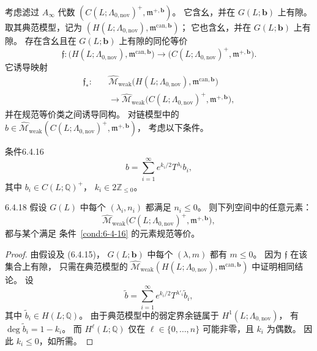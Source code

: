 考虑滤过 $A_\infty$ 代数
$(C(L;\Lambda_{0,\mathrm{nov}})^+,
\mathfrak m^{+,\boldsymbol b})$。
它含幺，并在 $G(L;\boldsymbol b)$ 上有隙。
取其典范模型，记为
$(H(L;\Lambda_{0,\mathrm{nov}}),
\mathfrak m^{\mathrm{can},\boldsymbol b})$；
它也含幺，并在 $G(L;\boldsymbol b)$ 上有隙。
存在含幺且在 $G(L;\boldsymbol b)$ 上有隙的同伦等价
\[
\mathfrak f:
\bigl(H(L;\Lambda_{0,\mathrm{nov}}),
\mathfrak m^{\mathrm{can},\boldsymbol b}\bigr)
\longrightarrow
\bigl(C(L;\Lambda_{0,\mathrm{nov}})^+,
\mathfrak m^{+,\boldsymbol b}\bigr).
\]
它诱导映射
\[
\begin{aligned}
\mathfrak f_*:\quad
&\widehat{\mathcal M}_{\mathrm{weak}}
\bigl(H(L;\Lambda_{0,\mathrm{nov}}),
\mathfrak m^{\mathrm{can},\boldsymbol b}\bigr)\\
&\longrightarrow
\widehat{\mathcal M}_{\mathrm{weak}}
\bigl(C(L;\Lambda_{0,\mathrm{nov}})^+,
\mathfrak m^{+,\boldsymbol b}\bigr),
\end{aligned}
\]
并在规范等价类之间诱导同构。
对链模型中的
$b\in\widehat{\mathcal M}_{\mathrm{weak}}
(C(L;\Lambda_{0,\mathrm{nov}})^+,
\mathfrak m^{+,\boldsymbol b})$，
考虑以下条件。

\begin{statement}{条件}{6.4.16}\label{cond:6-4-16}
\begin{equation}
b=\sum_{i=1}^{\infty}
e^{k_i/2}T^{\lambda_i}b_i,
\tag{6.4.17}\label{eq:6-4-17}
\end{equation}
其中 $b_i\in C(L;\mathbb Q)^+$，
$k_i\in2\mathbb Z_{\le0}$。
\end{statement}

\begin{lemma}{6.4.18}\label{lem:6-4-18}
假设 $G(L)$ 中每个
$(\lambda_i,n_i)$ 都满足 $n_i\le0$。
则下列空间中的任意元素：
\[
\widehat{\mathcal M}_{\mathrm{weak}}
\bigl(C(L;\Lambda_{0,\mathrm{nov}})^+,
\mathfrak m^{+,\boldsymbol b}\bigr),
\]
都与某个满足
条件~\ref{cond:6-4-16} 的元素规范等价。
\end{lemma}

\begin{proof}
由假设及 (6.4.15)，
$G(L;\boldsymbol b)$ 中每个
$(\lambda,m)$ 都有 $m\le0$。
因为 $\mathfrak f$ 在该集合上有隙，
只需在典范模型的
$\widehat{\mathcal M}_{\mathrm{weak}}
(H(L;\Lambda_{0,\mathrm{nov}}),
\mathfrak m^{\mathrm{can},\boldsymbol b})$
中证明相同结论。
设
\begin{equation}
\widetilde b
=\sum_{i=1}^{\infty}
e^{k_i/2}T^{\lambda'_i}\widetilde b_i,
\tag{6.4.19}\label{eq:6-4-19}
\end{equation}
其中 $\widetilde b_i\in H(L;\mathbb Q)$。
由于典范模型中的弱定界余链属于
$H^1(L;\Lambda_{0,\mathrm{nov}})$，
有 $\deg\widetilde b_i=1-k_i$。
而 $H^\ell(L;\mathbb Q)$
仅在 $\ell\in\{0,\ldots,n\}$
可能非零，且 $k_i$ 为偶数。
因此 $k_i\le0$，如所需。
\end{proof}


